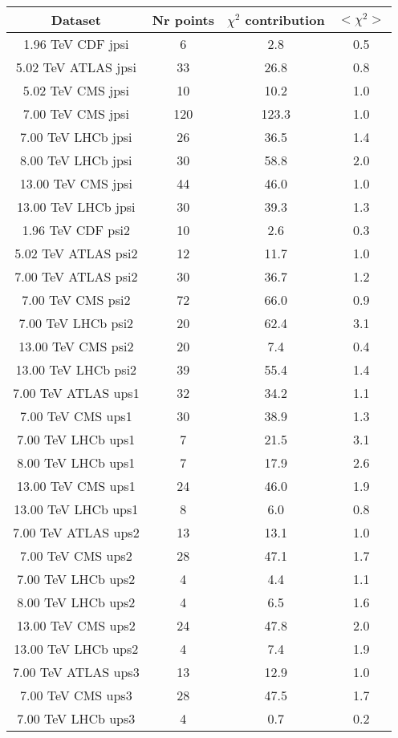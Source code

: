 \begin{table}[h!]
\centering
\begin{tabular}{c|c|c|c}
Dataset & Nr points & $\chi^2$ contribution & $<\chi^2>$ \\
\hline
1.96 TeV CDF jpsi & 6 & 2.8 & 0.5 \\
5.02 TeV ATLAS jpsi & 33 & 26.8 & 0.8 \\
5.02 TeV CMS jpsi & 10 & 10.2 & 1.0 \\
7.00 TeV CMS jpsi & 120 & 123.3 & 1.0 \\
7.00 TeV LHCb jpsi & 26 & 36.5 & 1.4 \\
8.00 TeV LHCb jpsi & 30 & 58.8 & 2.0 \\
13.00 TeV CMS jpsi & 44 & 46.0 & 1.0 \\
13.00 TeV LHCb jpsi & 30 & 39.3 & 1.3 \\
1.96 TeV CDF psi2 & 10 & 2.6 & 0.3 \\
5.02 TeV ATLAS psi2 & 12 & 11.7 & 1.0 \\
7.00 TeV ATLAS psi2 & 30 & 36.7 & 1.2 \\
7.00 TeV CMS psi2 & 72 & 66.0 & 0.9 \\
7.00 TeV LHCb psi2 & 20 & 62.4 & 3.1 \\
13.00 TeV CMS psi2 & 20 & 7.4 & 0.4 \\
13.00 TeV LHCb psi2 & 39 & 55.4 & 1.4 \\
7.00 TeV ATLAS ups1 & 32 & 34.2 & 1.1 \\
7.00 TeV CMS ups1 & 30 & 38.9 & 1.3 \\
7.00 TeV LHCb ups1 & 7 & 21.5 & 3.1 \\
8.00 TeV LHCb ups1 & 7 & 17.9 & 2.6 \\
13.00 TeV CMS ups1 & 24 & 46.0 & 1.9 \\
13.00 TeV LHCb ups1 & 8 & 6.0 & 0.8 \\
7.00 TeV ATLAS ups2 & 13 & 13.1 & 1.0 \\
7.00 TeV CMS ups2 & 28 & 47.1 & 1.7 \\
7.00 TeV LHCb ups2 & 4 & 4.4 & 1.1 \\
8.00 TeV LHCb ups2 & 4 & 6.5 & 1.6 \\
13.00 TeV CMS ups2 & 24 & 47.8 & 2.0 \\
13.00 TeV LHCb ups2 & 4 & 7.4 & 1.9 \\
7.00 TeV ATLAS ups3 & 13 & 12.9 & 1.0 \\
7.00 TeV CMS ups3 & 28 & 47.5 & 1.7 \\
7.00 TeV LHCb ups3 & 4 & 0.7 & 0.2 \\

\end{tabular}
\end{table}

